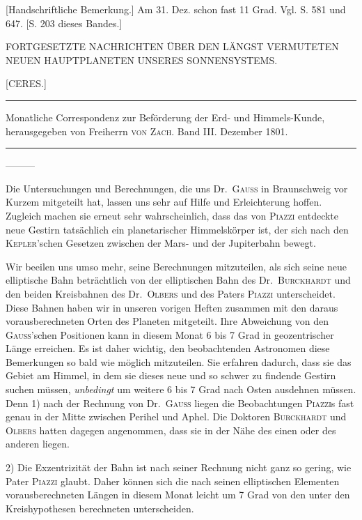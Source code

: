 \expandafter\def\csname HistoricalNoteText16\endcsname{[Handschriftliche Bemerkung.] Am 31. Dez. schon fast 11 Grad. Vgl. S. 581 und 647. [S. 203 dieses Bandes.]}
\clearpage{}%
\fancyhead[L]{\small [CERES.]}
\begin{center}
{\small FORTGESETZTE NACHRICHTEN ÜBER DEN LÄNGST VERMUTETEN NEUEN HAUPTPLANETEN UNSERES SONNENSYSTEMS.\par}
[CERES.]\par
\medskip\hrule\medskip
{\small Monatliche Correspondenz zur Beförderung der Erd- und Himmels-Kunde, herausgegeben von Freiherrn \textsc{von Zach}. Band III. Dezember 1801.\par}
\medskip\hrule
\end{center}\medskip
\noindent —\quad —\quad —\par
Die Untersuchungen und Berechnungen, die uns Dr.\ \textsc{Gauss} in Braunschweig vor Kurzem mitgeteilt hat, lassen uns sehr auf Hilfe und Erleichterung hoffen. Zugleich machen sie erneut sehr wahrscheinlich, dass das von \textsc{Piazzi} entdeckte neue Gestirn tatsächlich ein planetarischer Himmelskörper ist, der sich nach den \textsc{Kepler}'schen Gesetzen zwischen der Mars- und der Jupiterbahn bewegt.

Wir beeilen uns umso mehr, seine Berechnungen mitzuteilen, als sich seine neue elliptische Bahn beträchtlich von der elliptischen Bahn des Dr.\ \textsc{Burckhardt} und den beiden Kreisbahnen des Dr.\ \textsc{Olbers} und des Paters \textsc{Piazzi} unterscheidet. Diese Bahnen haben wir in unseren vorigen Heften zusammen mit den daraus vorausberechneten Orten des Planeten mitgeteilt. Ihre Abweichung von den \textsc{Gauss}'schen Positionen kann in diesem Monat 6 bis 7 Grad in geozentrischer Länge erreichen. Es ist daher wichtig, den beobachtenden Astronomen diese Bemerkungen so bald wie möglich mitzuteilen. Sie erfahren dadurch, dass sie das Gebiet am Himmel, in dem sie dieses neue und so schwer zu findende Gestirn suchen müssen, \textit{unbedingt} um weitere 6 bis 7 Grad nach Osten ausdehnen müssen. Denn 1) nach der Rechnung von Dr.\ \textsc{Gauss} liegen die Beobachtungen \textsc{Piazzi}s fast genau in der Mitte zwischen Perihel und Aphel. Die Doktoren \textsc{Burckhardt} und \textsc{Olbers} hatten dagegen angenommen, dass sie in der Nähe des einen oder des anderen liegen.

2) Die Exzentrizität der Bahn ist nach seiner Rechnung nicht ganz so gering, wie Pater \textsc{Piazzi} glaubt. Daher können sich die nach seinen elliptischen Elementen vorausberechneten Längen in diesem Monat leicht um 7 Grad von den unter den Kreishypothesen berechneten unterscheiden.

